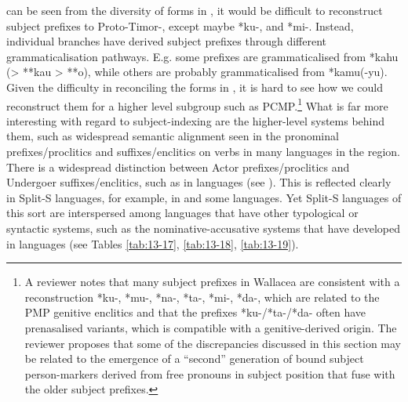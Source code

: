  can be seen from the diversity of forms in ,
it would be difficult to reconstruct subject prefixes to Proto-Timor-,
except maybe  *ku-, and  *mi-.
Instead, individual branches have derived subject prefixes through
different grammaticalisation pathways. E.g.
some  prefixes are grammaticalised from *kahu (> **kau
> **o), while others are probably grammaticalised from  *kamu(-yu).
Given the difficulty in reconciling the forms in ,
it is hard to see how we could reconstruct them for a higher
level subgroup such as PCMP.\footnote{
		A reviewer notes that many
		subject prefixes in Wallacea are consistent with a reconstruction
		 *ku-,  *mu-,  *na-,
		 *ta-,  *mi-,
		 *da-, which are related to the PMP genitive enclitics
		and that the prefixes *ku-/*ta-/*da- often
		have prenasalised variants, which is compatible with a genitive-derived origin.
		The reviewer proposes that some of the discrepancies
		discussed in this section may be related to the emergence of
		a “second” generation of bound subject person-markers derived
		from free pronouns in subject position that fuse with the older subject prefixes.}
What is far more interesting with regard to subject-indexing
are the higher-level systems behind them,
such as widespread semantic alignment seen in the pronominal
prefixes/proclitics and suffixes/enclitics on verbs in many languages in the region.
There is a widespread distinction between Actor prefixes/proclitics
and Undergoer suffixes/enclitics, such as in  languages (see ).
This is reflected clearly in Split-S languages,
for example, in 
and some  languages.
Yet Split-S languages of this sort are interspersed among languages
that have other typological or syntactic systems,
such as the nominative-accusative systems that have developed
in  languages (see Tables \ref{tab:13-17}, \ref{tab:13-18}, \ref{tab:13-19}).

